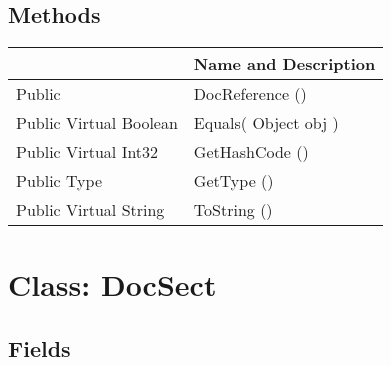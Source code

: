 \documentclass[11pt, oneside, a4paper]{book}
\begin{document}
\subsection{Methods}
\begin{center}
\begin{tabular}{| p{3cm} | p{12cm} | }
\hline
\textbf{ } & \textbf{ Name and Description}\\
\hline
 Public  &  DocReference ()\hypertarget{SoftwareEngineeringTools.{}Documentation.{}DocReference.{}DocReference}{}\\
\hline
 Public  Virtual  Boolean &  Equals(\hypertarget{SoftwareEngineeringTools.{}Documentation.{}DocReference.{}Equals\_Object}{} Object  obj  )\\
\hline
 Public  Virtual  Int32 &  GetHashCode ()\hypertarget{SoftwareEngineeringTools.{}Documentation.{}DocReference.{}GetHashCode}{}\\
\hline
 Public  Type &  GetType ()\hypertarget{SoftwareEngineeringTools.{}Documentation.{}DocReference.{}GetType}{}\\
\hline
 Public  Virtual  String &  ToString ()\hypertarget{SoftwareEngineeringTools.{}Documentation.{}DocReference.{}ToString}{}\\
\hline
\end{tabular}
\end{center}
 


\hypertarget{SoftwareEngineeringTools.{}Documentation.{}DocSect}{}
\section{Class: DocSect}

\subsection{Fields}
\end{document}

